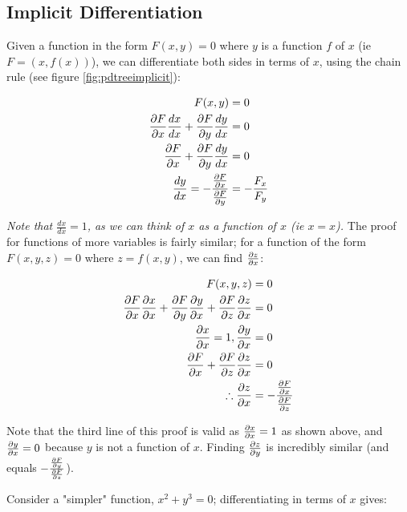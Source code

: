 \documentclass[12pt]{article}
\begin{document}

\subsection{Implicit Differentiation}

Given a function in the form $F(x,y) = 0$ where $y$ is a function $f$ of $x$ (ie $F = (x,f(x))$), we can differentiate both sides in terms of $x$, using the chain rule (see figure \ref{fig:pdtreeimplicit}):


\begin{equation}
    \begin{split}
        F(x,y) &= 0\\       
        \frac{\partial F}{\partial x} \frac{dx}{dx} +\frac{\partial F}{\partial y}\frac{dy}{dx} &= 0\\
        \frac{\partial F}{\partial x} + \frac{\partial F}{\partial y}\frac{dy}{dx} &= 0\\
        \frac{dy}{dx} = -\frac{\frac{\partial F}{\partial x}}{\frac{\partial F}{\partial y}} &= -\frac{F_x}{F_y}
    \end{split}
\end{equation}

\textit{Note that $\frac{dx}{dx} = 1$, as we can think of $x$ as a function of $x$ (ie $x = x$).} The proof for functions of more variables is fairly similar; for a function of the form $F(x,y,z)=0$ where $z = f(x,y)$, we can find $\frac{\partial z}{\partial x}$:

\begin{equation}
    \begin{split}
        F(x,y,z) &= 0\\
        \frac{\partial F}{\partial x}\frac{\partial x}{\partial x} + \frac{\partial F}{\partial y}\frac{\partial y}{\partial x} + \frac{\partial F}{\partial z}\frac{\partial z}{\partial x} &= 0\\
        \frac{\partial x}{\partial x} = 1, \frac{\partial y}{\partial x} &= 0\\
        \frac{\partial F}{\partial x} + \frac{\partial F}{\partial z}\frac{\partial z}{\partial x} &= 0\\
        \therefore \frac{\partial z}{\partial x} &= -\frac{\frac{\partial F}{\partial x}}{\frac{\partial F}{\partial z}}\\
    \end{split}
\end{equation}

Note that the third line of this proof is valid as $\frac{\partial x}{\partial x} = 1$ as shown above, and $\frac{\partial y}{\partial x} = 0$ because $y$ is not a function of $x$. Finding $\frac{\partial z}{\partial y}$ is incredibly similar (and equals $-\frac{\frac{\partial F}{\partial y}}{\frac{\partial F}{\partial z}}$).

Consider a "simpler" function, $x^2+y^3=0$; differentiating in terms of $x$ gives:
\end{document}
